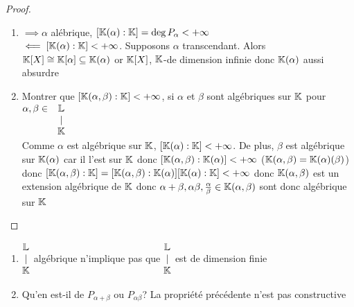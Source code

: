 \documentclass[]{report}
\begin{document}
    \begin{proof}
        \begin{enumerate}
            \item $\implies \alpha$ alébrique, $[\mathbb{K}(\alpha):\mathbb{K}]=\deg P_\alpha<+\infty$\\
            $\impliedby [\mathbb{K}(\alpha):\mathbb{K}]<+\infty$. Supposons $\alpha$ transcendant. Alors $\mathbb{K}[X]\cong \mathbb{K}[\alpha]\subseteq \mathbb{K}(\alpha)$ or $\mathbb{K}[X]$, $\mathbb{K}$-\ev de dimension infinie donc $\mathbb{K}(\alpha)$ aussi absurdre
            \item Montrer que $[\mathbb{K}(\alpha,\beta):\mathbb{K}]<+\infty$, si $\alpha$ et $\beta$ sont algébriques sur $\mathbb{K}$ pour $\begin{matrix}
                \alpha,\beta\in& \mathbb{L}\\
                &|\\
                &\mathbb{K}
            \end{matrix}$\\
            Comme $\alpha$ est algébrique sur $\mathbb{K}$, $[\mathbb{K}(\alpha):\mathbb{K}]<+\infty$. De plus, $\beta$ est algébrique sur $\mathbb{K}(\alpha)$ car il l'est sur $\mathbb{K}$ donc $[\mathbb{K}(\alpha,\beta):\mathbb{K}(\alpha)]<+\infty$ ($\mathbb{K}(\alpha,\beta)=\mathbb{K}(\alpha)(\beta)$) donc $[\mathbb{K}(\alpha,\beta):\mathbb{K}]=[\mathbb{K}(\alpha,\beta):\mathbb{K}(\alpha)][\mathbb{K}(\alpha):\mathbb{K}]<+\infty$ donc $\mathbb{K}(\alpha,\beta)$ est un extension algébrique de $\mathbb{K}$ donc $\alpha+\beta,\alpha\beta,\frac{\alpha}{\beta}\in\mathbb{K}(\alpha,\beta)$ sont donc algébrique sur $\mathbb{K}$
        \end{enumerate}
    \end{proof}

    \begin{re}{}{}
        \begin{enumerate}
            \item $\begin{matrix}
                \mathbb{L}\\
                |\\
                \mathbb{K}
            \end{matrix}$ algébrique n'implique pas que $\begin{matrix}
                \mathbb{L}\\
                |\\
                \mathbb{K}
            \end{matrix}$ est de dimension finie
            \item Qu'en est-il de $P_{\alpha+\beta}$ ou $P_{\alpha\beta}$? La propriété précédente n'est pas constructive
        \end{enumerate}
    \end{re}
\end{document}
